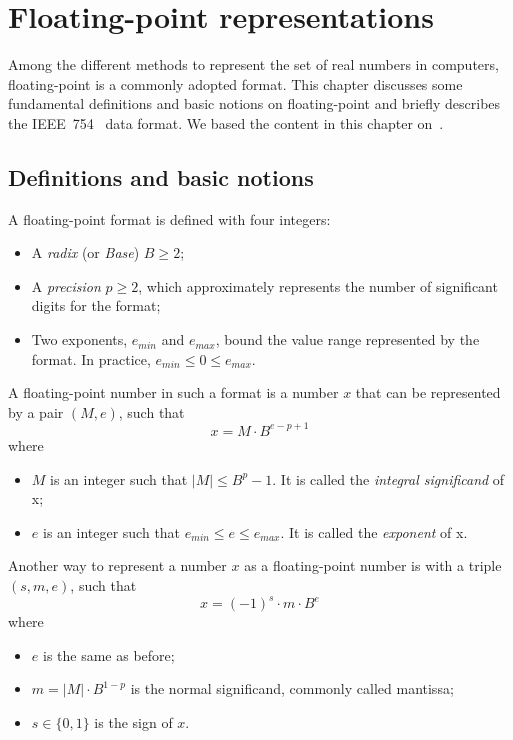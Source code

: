\chapter{Floating-point representations}
\label{ch:background}
Among the different methods to represent the set of real numbers in computers,
floating-point is a commonly adopted format.
This chapter discusses some fundamental definitions and basic notions on floating-point
and briefly describes the IEEE~754~\cite{ieee754_2008-ev} data format.
We based the content in this chapter on~\cite{Muller2018-zm}.

\section{Definitions and basic notions}
A floating-point format is defined with four integers:
\begin{itemize}
	\item A \textit{radix} (or \textit{Base}) $B \ge 2$;
	\item A \textit{precision} $p \ge 2$, which approximately represents the number of significant digits for the format;
	\item Two exponents, $e_{min}$ and $e_{max}$, bound the value range represented by the format. In practice, $e_{min} \le 0 \le e_{max}$.
\end{itemize}

A floating-point number in such a format is a number $x$ that can be represented by a pair $(M,e)$, such that
\begin{equation}
	x = M \cdot B^{e-p+1}
\end{equation}
where
\begin{itemize}
	\item $M$ is an integer such that $|M| \le B^{p}-1$. It is called the \textit{integral significand} of x;
	\item $e$ is an integer such that $e_{min} \le e \le e_{max}$. It is called the \textit{exponent} of x.
\end{itemize}

Another way to represent a number $x$ as a floating-point number is with a triple $(s, m, e)$, such that
\begin{equation}
	x = (-1)^{s} \cdot m \cdot B^{e}
\end{equation}
where
\begin{itemize}
	\item $e$ is the same as before;
	\item $m = |M| \cdot B^{1-p}$ is the normal significand, commonly called mantissa;
	\item $s \in \{0, 1\}$ is the sign of $x$.
\end{itemize}

